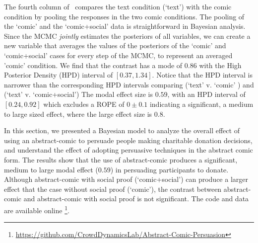 The fourth column of~ compares the text condition (`text') with the comic condition by pooling the responses in the two comic conditions. The pooling of the `comic' and the `comic+social' data is straightforward in Bayesian analysis. Since the MCMC \textit{jointly} estimates the posteriors of all variables, we can create a new variable that averages the values of the posteriors of the `comic' and `comic+social' cases for every step of the MCMC, to represent an averaged 'comic' condition.  We find that the contrast has a mode of $0.86$ with the High Posterior Density (HPD) interval of $[0.37, 1.34]$. Notice that the HPD interval is narrower than the corresponding HPD intervals comparing (`text' v. `comic' ) and (`text' v. `comic+social') The modal effect size is $0.59$, with an HPD interval of $[0.24, 0.92]$ which excludes a ROPE of $0 \pm 0.1$ indicating a significant, a medium to large sized effect, where the large effect size is $0.8$. 

In this section, we presented a Bayesian model to analyze the overall effect of using an abstract-comic to persuade people making charitable donation decisions, and understand the effect of adopting persuasive techniques in the abstract comic form. The results show that the use of abstract-comic produces a significant, medium to large modal effect ($0.59$) in persuading participants to donate. Although abstract-comic with social proof (`comic+social') can produce a larger effect that the case without social proof (`comic'), the contrast between abstract-comic and abstract-comic with social proof is not significant. The code and data are available online \footnote{\url{https://github.com/CrowdDynamicsLab/Abstract-Comic-Persuasion}}. 
